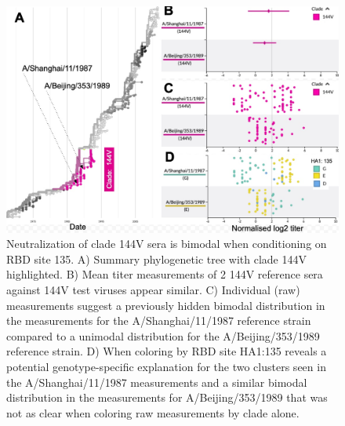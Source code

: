 \documentclass[utf8]{FrontiersinHarvard} %
\begin{document}
\begin{figure}[h!]
  \begin{center}
    \includegraphics[width=\textwidth]{figures/figure-4.jpg}
  \end{center}
  \caption{
    Neutralization of clade 144V sera is bimodal when conditioning on RBD site 135.
    A) Summary phylogenetic tree with clade 144V highlighted.
    B) Mean titer measurements of 2 144V reference sera against 144V test viruses appear similar.
    C) Individual (raw) measurements suggest a previously hidden bimodal distribution in the measurements for the A/Shanghai/11/1987 reference strain compared to a unimodal distribution for the A/Beijing/353/1989 reference strain.
    D) When coloring by RBD site HA1:135 reveals a  potential genotype-specific explanation for the two clusters seen in the A/Shanghai/11/1987 measurements and a similar bimodal distribution in the measurements for A/Beijing/353/1989 that was not as clear when coloring raw measurements by clade alone.}
  \label{fig:4}
\end{figure}

\end{document}

